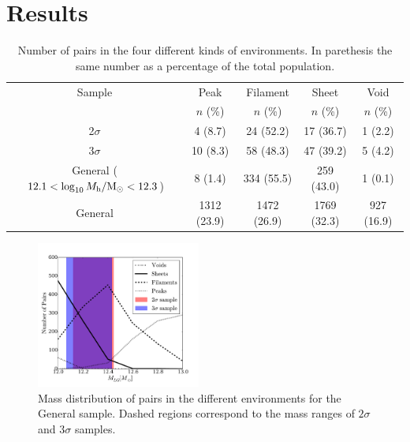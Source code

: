 \documentclass{emulateapj}
\newcommand{\Msun}{{\ifmmode{{\rm {M_{\odot}}}}\else{${\rm{M_{\odot}}}$}\fi}}
\begin{document}
\section{Results}
\label{sec:results}

\begin{table}
\begin{center}
\begin{tabular}{ccccc}\hline\hline
Sample & Peak & Filament & Sheet & Void\\
       & $n$ (\%) & $n$ (\%) & $n$ (\%) & $n$ (\%) \\\hline
2$\sigma$ & 4 (8.7) & 24 (52.2) &  17 (36.7) & 1 (2.2)\\
3$\sigma$ & 10 (8.3) & 58 (48.3) & 47 (39.2) & 5 (4.2)\\  
General ($12.1<\log_{10} M_{\rm h}/\Msun<12.3$)& 8 (1.4) & 334 (55.5) & 259
(43.0) & 1 (0.1)\\
General & 1312 (23.9) & 1472 (26.9) & 1769 (32.3) & 927 (16.9)\\

\hline\hline
\end{tabular}
\caption{
Number of pairs in the four different kinds of environments. In
parethesis the same number as a percentage of the
total population.
\label{table:web_type}}
\end{center}
\end{table}


\begin{figure}
\begin{center}
  \includegraphics[width=0.48\textwidth]{histogram_mass_distro.pdf}
\caption{Mass distribution of pairs in the different environments
for the General sample.
Dashed regions correspond to the mass ranges of $2\sigma$ and $3\sigma$ samples.
\label{fig:median_fraction}}
\end{center}
\end{figure}
\end{document}
